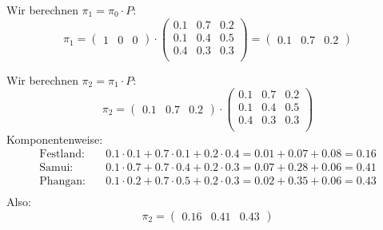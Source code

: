 \begin{mychallenge}
\begin{myanswer}
        Wir berechnen $\pi_1 = \pi_0 \cdot P$:
        \[
            \pi_1 = \begin{pmatrix} 1 & 0 & 0 \end{pmatrix}
            \cdot
            \begin{pmatrix}
                0.1 & 0.7 & 0.2 \\
                0.1 & 0.4 & 0.5 \\
                0.4 & 0.3 & 0.3 \\
            \end{pmatrix}
            = \begin{pmatrix} 0.1 & 0.7 & 0.2 \end{pmatrix}
        \]

        Wir berechnen $\pi_2 = \pi_1 \cdot P$:
        \[
            \pi_2 = \begin{pmatrix} 0.1 & 0.7 & 0.2 \end{pmatrix}
            \cdot
            \begin{pmatrix}
                0.1 & 0.7 & 0.2 \\
                0.1 & 0.4 & 0.5 \\
                0.4 & 0.3 & 0.3 \\
            \end{pmatrix}
        \]
        Komponentenweise:
        \begin{align*}
            \text{Festland:} & \quad 0.1 \cdot 0.1 + 0.7 \cdot 0.1 + 0.2 \cdot 0.4 = 0.01 + 0.07 + 0.08 = 0.16 \\
            \text{Samui:}    & \quad 0.1 \cdot 0.7 + 0.7 \cdot 0.4 + 0.2 \cdot 0.3 = 0.07 + 0.28 + 0.06 = 0.41 \\
            \text{Phangan:}  & \quad 0.1 \cdot 0.2 + 0.7 \cdot 0.5 + 0.2 \cdot 0.3 = 0.02 + 0.35 + 0.06 = 0.43 \\
        \end{align*}
        Also:
        \[
            \pi_2 = \begin{pmatrix} 0.16 & 0.41 & 0.43 \end{pmatrix}
        \]


\end{myanswer}
\end{mychallenge}
